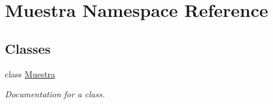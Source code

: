 \hypertarget{namespace_muestra}{}\section{Muestra Namespace Reference}
\label{namespace_muestra}
\subsection*{Classes}
\begin{DoxyCompactItemize}
\item 
class \mbox{\hyperlink{class_muestra_1_1_muestra}{Muestra}}
\begin{DoxyCompactList}\small\item\em Documentation for a class. \end{DoxyCompactList}\end{DoxyCompactItemize}
